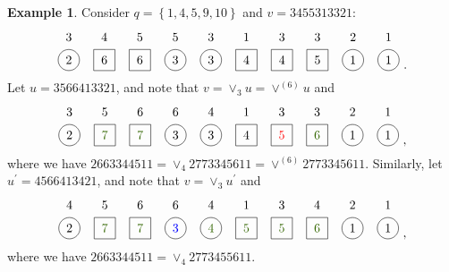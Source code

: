 \documentclass[reqno]{amsart}%
\newcommand{\0}{\phantom{c}}
\theoremstyle{plain}
\theoremstyle{definition}
\newtheorem{example}[thm]{Example}
\numberwithin{equation}{section}
\begin{document}
\begin{example}
Consider $q = \left\{  1,4,5,9,10 \right\}  $ and $v = 3455313321$:
\[
\begin{tikzpicture}[baseline=-7]
\def\ll{0.65}   %
\foreach \i in {6,10} { \node at (\i,\ll) {$1$}; }
\foreach \i in {9} { \node at (\i,\ll) {$2$}; }
\foreach \i in {1,5,7,8} { \node at (\i,\ll) {$3$}; }
\foreach \i in {2} { \node at (\i,\ll) {$4$}; }
\foreach \i in {3,4} { \node at (\i,\ll) {$5$}; }
\foreach \i in {1,4,5,9,10} { \draw (\i,0) circle (0.3); }
\foreach \i in {2,3,6,7,8} { \draw (\i-.3,0-.3) rectangle +(0.6,+0.6); }
\foreach \i in {9,10} { \node at (\i,0) {$1$}; }
\foreach \i in {1} { \node at (\i,0) {$2$}; }
\foreach \i in {4,5} { \node at (\i,0) {$3$}; }
\foreach \i in {6,7} { \node at (\i,0) {$4$}; }
\foreach \i in {8} { \node at (\i,0) {$5$}; }
\foreach \i in {2,3} { \node at (\i,0) {$6$}; }
\end{tikzpicture}\ .
\]
Let $u = 3566413321$, and note that $v = \vee_{3} u = \vee^{(6)} u$ and
\[
\begin{tikzpicture}[baseline=-7]
\def\ll{0.65}   %
\foreach \i in {6,10} { \node at (\i,\ll) {$1$}; }
\foreach \i in {9} { \node at (\i,\ll) {$2$}; }
\foreach \i in {1,7,8} { \node at (\i,\ll) {$3$}; }
\foreach \i in {5} { \node at (\i,\ll) {$4$}; }
\foreach \i in {2} { \node at (\i,\ll) {$5$}; }
\foreach \i in {3,4} { \node at (\i,\ll) {$6$}; }
\foreach \i in {1,4,5,9,10} { \draw (\i,0) circle (0.3); }
\foreach \i in {2,3,6,7,8} { \draw (\i-.3,0-.3) rectangle +(0.6,+0.6); }
\foreach \i in {9,10} { \node at (\i,0) {$1$}; }
\foreach \i in {1} { \node at (\i,0) {$2$}; }
\foreach \i in {4,5} { \node at (\i,0) {$3$}; }
\foreach \i in {6} { \node at (\i,0) {$4$}; }
\foreach \i in {7} { \node[red] at (\i,0) {$5$}; }
\foreach \i in {8} { \node[dgreencolor] at (\i,0) {$6$}; }
\foreach \i in {2,3} { \node[dgreencolor] at (\i,0) {$7$}; }
\end{tikzpicture}\ ,
\]
where we have $2663344511 = \vee_{4} 2773345611 = \vee^{(6)} 2773345611$.
Similarly, let $u^{\prime}= 4566413421$, and note that $v = \vee_{3}
u^{\prime}$ and
\[
\begin{tikzpicture}[baseline=-7]
\def\ll{0.65}   %
\foreach \i in {6,10} { \node at (\i,\ll) {$1$}; }
\foreach \i in {9} { \node at (\i,\ll) {$2$}; }
\foreach \i in {7} { \node at (\i,\ll) {$3$}; }
\foreach \i in {1,5,8} { \node at (\i,\ll) {$4$}; }
\foreach \i in {2} { \node at (\i,\ll) {$5$}; }
\foreach \i in {3,4} { \node at (\i,\ll) {$6$}; }
\foreach \i in {1,4,5,9,10} { \draw (\i,0) circle (0.3); }
\foreach \i in {2,3,6,7,8} { \draw (\i-.3,0-.3) rectangle +(0.6,+0.6); }
\foreach \i in {9,10} { \node at (\i,0) {$1$}; }
\foreach \i in {1} { \node at (\i,0) {$2$}; }
\foreach \i in {4} { \node[blue] at (\i,0) {$3$}; }
\foreach \i in {5} { \node[dgreencolor] at (\i,0) {$4$}; }
\foreach \i in {6,7} { \node[dgreencolor] at (\i,0) {$5$}; }
\foreach \i in {8} { \node[dgreencolor] at (\i,0) {$6$}; }
\foreach \i in {2,3} { \node[dgreencolor] at (\i,0) {$7$}; }
\end{tikzpicture}\ ,
\]
where we have $2663344511 = \vee_{4} 2773455611$.
\end{example}
\end{document}
